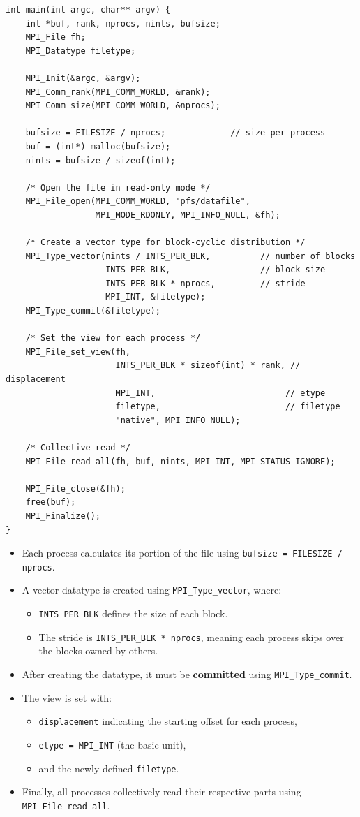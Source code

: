 \documentclass[12pt]{book}
\begin{document}
\begin{lstlisting}[style=cppstyle]
int main(int argc, char** argv) {
    int *buf, rank, nprocs, nints, bufsize;
    MPI_File fh;
    MPI_Datatype filetype;

    MPI_Init(&argc, &argv);
    MPI_Comm_rank(MPI_COMM_WORLD, &rank);
    MPI_Comm_size(MPI_COMM_WORLD, &nprocs);

    bufsize = FILESIZE / nprocs;             // size per process
    buf = (int*) malloc(bufsize);
    nints = bufsize / sizeof(int);

    /* Open the file in read-only mode */
    MPI_File_open(MPI_COMM_WORLD, "pfs/datafile",
                  MPI_MODE_RDONLY, MPI_INFO_NULL, &fh);

    /* Create a vector type for block-cyclic distribution */
    MPI_Type_vector(nints / INTS_PER_BLK,          // number of blocks
                    INTS_PER_BLK,                  // block size
                    INTS_PER_BLK * nprocs,         // stride
                    MPI_INT, &filetype);
    MPI_Type_commit(&filetype);

    /* Set the view for each process */
    MPI_File_set_view(fh,
                      INTS_PER_BLK * sizeof(int) * rank, // displacement
                      MPI_INT,                          // etype
                      filetype,                         // filetype
                      "native", MPI_INFO_NULL);

    /* Collective read */
    MPI_File_read_all(fh, buf, nints, MPI_INT, MPI_STATUS_IGNORE);

    MPI_File_close(&fh);
    free(buf);
    MPI_Finalize();
}
\end{lstlisting}

\begin{itemize}
    \item Each process calculates its portion of the file using \texttt{bufsize = FILESIZE / nprocs}.
    \item A vector datatype is created using \texttt{MPI\_Type\_vector}, where:
    \begin{itemize}
        \item \texttt{INTS\_PER\_BLK} defines the size of each block.
        \item The stride is \texttt{INTS\_PER\_BLK * nprocs}, meaning each process skips over the blocks owned by others.
    \end{itemize}
    \item After creating the datatype, it must be \textbf{committed} using \texttt{MPI\_Type\_commit}.
    \item The view is set with:
    \begin{itemize}
        \item \texttt{displacement} indicating the starting offset for each process,
        \item \texttt{etype = MPI\_INT} (the basic unit),
        \item and the newly defined \texttt{filetype}.
    \end{itemize}
    \item Finally, all processes collectively read their respective parts using
    \texttt{MPI\_File\_read\_all}.
\end{itemize}
\end{document}
